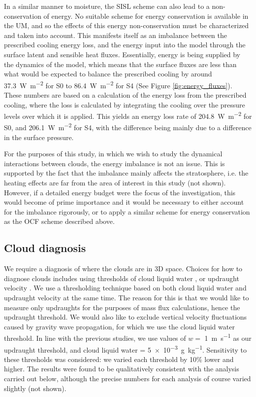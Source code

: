 \documentclass[11pt,a4paper]{article}
\newcommand\todo[1]{\textbf{TODO: #1}}
\begin{document}
In a similar manner to moisture, the SISL scheme can also lead to a non-conservation of energy. No suitable scheme for energy conservation is available in the UM, and so the effects of this energy non-conservation must be characterized and taken into account. This manifests itself as an imbalance between the prescribed cooling energy loss, and the energy input into the model through the surface latent and sensible heat fluxes. Essentially, energy is being supplied by the dynamics of the model, which means that the surface fluxes are less than what would be expected to balance the prescribed cooling by around \SI{37.3}{W.m^{-2}} for S0 to \SI{86.4}{W.m^{-2}} for S4 (See Figure \ref{fig:energy_fluxes}). These numbers are based on a calculation of the energy loss from the prescribed cooling, where the loss is calculated by integrating the cooling over the pressure levels over which it is applied. This yields an energy loss rate of \SI{204.8}{W.m^{-2}} for S0, and \SI{206.1}{W.m^{-2}} for S4, with the difference being mainly due to a difference in the surface pressure.

For the purposes of this study, in which we wish to study the dynamical interactions between clouds, the energy imbalance is not an issue. This is supported by the fact that the imbalance mainly affects the stratosphere, i.e. the heating effects are far from the area of interest in this study (not shown). However, if a detailed energy budget were the focus of the investigation, this would become of prime importance and it would be necessary to either account for the imbalance rigorously, or to apply a similar scheme for energy conservation as the OCF scheme described above. 

\subsection{Cloud diagnosis}
\label{subsec:cloud_diag}

We require a diagnosis of where the clouds are in 3D space. Choices for how to diagnose clouds includes using thresholds of cloud liquid water \parencite{CC2006II}, or updraught velocity \parencite{CC2006II, zipser1980cumulonimbus}. We use a thresholding technique based on both cloud liquid water and updraught velocity at the same time. The reason for this is that we would like to measure only updraughts for the purposes of mass flux calculations, hence the updraught threshold. We would also like to exclude vertical velocity fluctuations caused by gravity wave propagation, for which we use the cloud liquid water threshold. In line with the previous studies, we use values of $w =$ \SI{1}{m.s^{-1}} as our updraught threshold, and cloud liquid water = \SI{5e-3}{g.kg^{-1}}. Sensitivity to these thresholds was considered: we varied each threshold by 10\% lower and higher. The results were found to be qualitatively consistent with the analysis carried out below, although the precise numbers for each analysis of course varied slightly (not shown).
\end{document}
